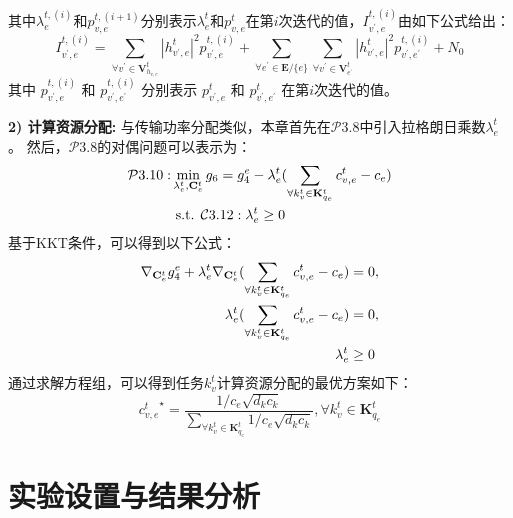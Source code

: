 其中$\lambda_{e}^{t,(i)}$和$p_{v, e}^{t, (i+1)}$分别表示$\lambda_{e}^{t}$和$p_{v, e}^{t}$在第$i$次迭代的值，${I}_{v^{\prime}, e}^{t, (i)}$由如下公式给出：
\begin{equation}
	{I}_{v^{\prime}, e}^{t, (i)} = \sum\limits_{\forall v^{\prime} \in \mathbf{V}_{h_{v, e}}^{t}} |h_{v^{\prime}, e}^t|^2 p_{v^{\prime}, e}^{t, (i)} + \sum\limits_{\forall e^{\prime} \in \mathbf{E} / \{e\}} \sum\limits_{\forall v^{\prime} \in \mathbf{V}_{e^{\prime}}^{t}} |h_{v^{\prime}, e}^t|^2 p_{v^{\prime}, e^{\prime}}^{t, (i)} + N_{0}
\end{equation}
其中 $p_{v^{\prime}, e}^{t, (i)}$ 和 $p_{v^{\prime}, e^{\prime}}^{t, (i)}$ 分别表示 $p_{v^{\prime}, e}^{t}$ 和 $p_{v^{\prime}, e^{\prime}}^{t}$ 在第$i$次迭代的值。

\textbf{2) 计算资源分配:} 与传输功率分配类似，本章首先在$\mathcal{P}3.8$中引入拉格朗日乘数${\lambda}_{e}^{t}$。
然后，$\mathcal{P}3.8$的对偶问题可以表示为：
\begin{align}
	\mathcal{P}3.10: & \min_{\mathbf{\lambda}_{e}^{t}, \mathbf{{C}}_{e}^{t}}  g_6 = g_4^e - {\lambda}_{e}^{t} (\sum_{\forall k_{v}^{t} \in {\mathbf{K}_{q_e}^{t} }} {c_{v, e}^t} - c_{e} ) \notag \\
		&\text { s.t. } \mathcal{C}3.12: \mathbf{\lambda}_{e}^{t} \geq 0 
\end{align}
基于KKT条件\cite{boyd2004convex}，可以得到以下公式：
\begin{align}
	\nabla_{\mathbf{C}_e^{t}} g_4^e + \mathbf{\lambda}_{e}^{t}\nabla_{\mathbf{C}_e^{t}} (\sum_{\forall k_{v}^{t} \in {\mathbf{K}_{q_e}^{t} }} {c_{v, e}^t} - c_{e} ) &= 0, \notag \\
	\mathbf{\lambda}_{e}^{t}( \sum_{\forall k_{v}^{t} \in {\mathbf{K}_{q_e}^{t} }} {c_{v, e}^t} - {c_{e}} ) &= 0, \notag \\
	\mathbf{\lambda}_{e}^{t} &\geq 0
\end{align}
通过求解方程组，可以得到任务$k_{v}^{t}$计算资源分配的最优方案如下：
\begin{equation}
	{c_{v, e}^{t}}^{\star} = \frac{1 / c_e \sqrt{d_k  c_k} } {\sum_{\forall k_{v}^{t} \in {\mathbf{K}_{q_e}^{t} }} 1 / c_e \sqrt{d_k  c_k}} , \forall k_{v}^{t} \in {\mathbf{K}_{q_e}^{t} } 
\end{equation}

\section{实验设置与结果分析}\label{section 3-5}

